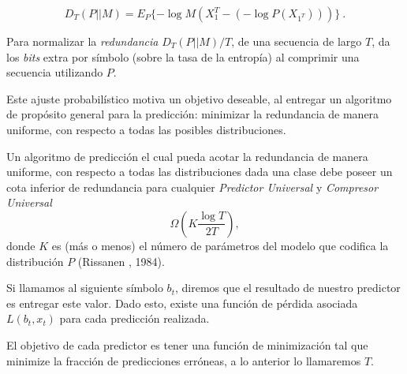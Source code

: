 \begin{equation}
D_{T} ( P || M ) = E_{P} \{ - \log M(X_{1}^{T} - (- \log P(X_{1^{T}})   )  )       \} \ .
\end{equation}
 

Para normalizar la \emph{redundancia} $D_{T} ( P || M ) / T $, de una secuencia de largo $T$, da los  \emph{bits} extra por símbolo (sobre la tasa de la entropía) al comprimir una secuencia utilizando $P$.  

Este ajuste probabilístico motiva un objetivo deseable, al entregar un algoritmo de propósito general para la predicción: minimizar la redundancia de manera uniforme, con respecto a todas las posibles distribuciones. 

Un algoritmo de predicción el cual pueda acotar la redundancia de manera uniforme, con respecto a todas las distribuciones dada una clase debe poseer un cota inferior de redundancia para cualquier \emph{Predictor Universal} y \emph{Compresor Universal} \begin{equation}
\Omega \left(  K \dfrac{\log T}{2 T } \right),
\end{equation} donde $K$ es (más o menos) el número de parámetros del modelo que codifica la distribución $P$ (Rissanen \cite{Rissanen1984}, 1984).






 

Si llamamos al siguiente símbolo $b_{t}$, diremos que el resultado de nuestro predictor es entregar este valor. Dado esto, existe una función de pérdida asociada $L( b_{t},x_{t} )$ para cada predicción realizada. 

El objetivo de cada predictor es tener una función de minimización tal que minimize la fracción de predicciones erróneas, a lo anterior lo llamaremos $T$.%








